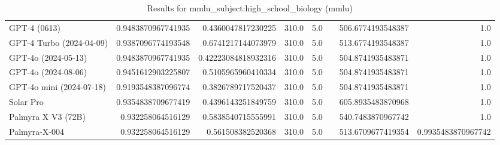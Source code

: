 \begin{table}[htp]
{\begin{tabular}{lrrrrrrr}
GPT-4 (0613) & 0.9483870967741935 & 0.4360047817230225 & 310.0 & 5.0 &  & 506.6774193548387 & 1.0 \\
GPT-4 Turbo (2024-04-09) & 0.9387096774193548 & 0.6741217144073979 & 310.0 & 5.0 &  & 513.6774193548387 & 1.0 \\
GPT-4o (2024-05-13) & 0.9483870967741935 & 0.42223084818932316 & 310.0 & 5.0 &  & 504.8741935483871 & 1.0 \\
GPT-4o (2024-08-06) & 0.9451612903225807 & 0.5105965960410334 & 310.0 & 5.0 &  & 504.8741935483871 & 1.0 \\
GPT-4o mini (2024-07-18) & 0.9193548387096774 & 0.3826789717520437 & 310.0 & 5.0 &  & 504.8741935483871 & 1.0 \\
Solar Pro & 0.9354838709677419 & 0.4396143251849759 & 310.0 & 5.0 &  & 605.8935483870968 & 1.0 \\
Palmyra X V3 (72B) & 0.932258064516129 & 0.5838540715555991 & 310.0 & 5.0 &  & 540.7483870967742 & 1.0 \\
Palmyra-X-004 & 0.932258064516129 & 0.561508382520368 & 310.0 & 5.0 &  & 513.6709677419354 & 0.9935483870967742 \\
\bottomrule
\end{tabular}}
\caption{Results for mmlu_subject:high_school_biology (mmlu)}
\label{fig:mmlu_subject:high_school_biology (mmlu)}
\end{table}